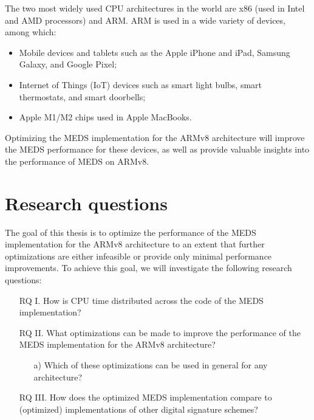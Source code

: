 \documentclass[11pt,a4paper]{report}
\theoremstyle{definition}
\begin{document}
The two most widely used CPU architectures in the world are x86 (used in Intel and AMD processors) and ARM. ARM is used in a wide variety of devices, among which:
\begin{itemize}
  \item Mobile devices and tablets such as the Apple iPhone and iPad, Samsung Galaxy, and Google Pixel;
  \item Internet of Things (IoT) devices such as smart light bulbs, smart thermostats, and smart doorbells;
  \item Apple M1/M2 chips used in Apple MacBooks.
\end{itemize}
Optimizing the MEDS implementation for the ARMv8 architecture will improve the MEDS performance for these devices, as well as provide valuable insights into the performance of MEDS on ARMv8.

\section{Research questions}
The goal of this thesis is to optimize the performance of the MEDS implementation for the ARMv8 architecture to an extent that further optimizations are either infeasible or provide only minimal performance improvements. To achieve this goal, we will investigate the following research questions:
\begin{itemize}[left=35pt,labelsep=15pt]
  \item[RQ I.] How is CPU time distributed across the code of the MEDS implementation?
  \item[RQ II.] What optimizations can be made to improve the performance of the MEDS implementation for the ARMv8 architecture?
  \begin{itemize}
    \item[a)] Which of these optimizations can be used in general for any 
    architecture?
  \end{itemize}
  \item[RQ III.] How does the optimized MEDS implementation compare to (optimized) implementations of other digital signature schemes?
\end{itemize}
\end{document}

